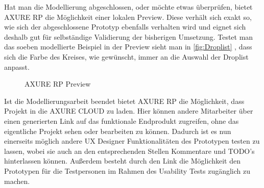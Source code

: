 Hat man die Modellierung abgeschlossen, oder möchte etwas überprüfen, bietet AXURE RP die Möglichkeit einer lokalen Preview.
Diese verhält sich exakt so, wie sich der abgeschlossene Prototyp ebenfalls verhalten wird und eignet sich deshalb gut für selbständige Validierung der bisherigen Umsetzung.
Testet man das soeben modellierte Beispiel in der Preview sieht man in \cref{fig:Droplist} , dass sich die Farbe des Kreises, wie gewünscht, immer an die Auswahl der Droplist anpasst.
\begin{figure}%
\centering
{}%
\qquad
{}%
\qquad
{}%
\qquad
{}%

\caption{AXURE RP Preview}%
\label{fig:Preview}
\end{figure}

Ist die Modellierungsarbeit beendet bietet AXURE RP die Möglichkeit, dass Projekt in die AXURE CLOUD zu laden.
Hier können andere Mitarbeiter über einen generierten Link auf das funktionale Endprodukt zugreifen, ohne das eigentliche Projekt sehen oder bearbeiten zu können.
Dadurch ist es nun einerseits möglich andere UX Designer Funktionalitäten des Prototypen testen zu lassen, wobei sie auch an den entsprechenden Stellen Kommentare und TODO's hinterlassen können.
Außerdem besteht durch den Link die Möglichkeit den Prototypen für die Testpersonen im Rahmen des Usability Tests zugänglich zu machen.

